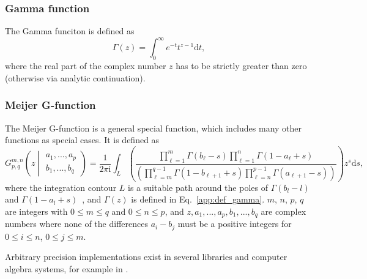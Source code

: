 \subsubsection*{Gamma function}
The Gamma funciton is defined as~\cite[Eq.~5.2.1]{NIST:DLMF}
\begin{equation}
\label{app:def_gamma}
\Gamma\left(z\right)=\int_{0}^{\infty}e^{-t}t^{z-1}\mathrm{d}t,
\end{equation}
where the real part of the complex number $z$ has to be strictly greater than zero (otherwise via analytic continuation).
\subsubsection*{Meijer G-function}
The Meijer G-function is a general special function, which includes many other functions as special cases. It is defined as
\begin{equation}
\label{app:def_meijerG}
G^{m,n}_{p,q}\left(z\middle|
\begin{matrix}
a_1,...,a_p\\
b_1,...,b_q
\end{matrix}
\right)
=
\frac{1}{2\pi\mathrm{i}}\int_{L%
}\left({\textstyle\frac{\prod\limits_{\ell=1}^{m}\Gamma\left(b_{\ell}-s\right%
)\prod\limits_{\ell=1}^{n}\Gamma\left(1-a_{\ell}+s\right)}{\left(\prod\limits_%
{\ell=m}^{q-1}\Gamma\left(1-b_{\ell+1}+s\right)\prod\limits_{\ell=n}^{p-1}%
\Gamma\left(a_{\ell+1}-s\right)\right)}}\right)z^{s}\mathrm{d}s,
\end{equation}
where the integration contour $L$ is a suitable path around the poles of $\Gamma(b_l-l)$ and \mbox{$\Gamma(1-a_l+s)$}~\cite[Eq.~16.17.1]{NIST:DLMF}, and $\Gamma(z)$ is defined in Eq.~\eqref{app:def_gamma}. $m$, $n$, $p$, $q$ are integers with $0 \leq m \leq q$ and $0 \leq n \leq p$, and $z,a_1,...,a_p,b_1,...,b_q$ are complex numbers where none of the differences $a_i-b_j$ must be a positive integers for $0\leq i \leq n$, $0\leq j \leq m$.

Arbitrary precision implementations exist in several libraries and computer algebra systems, for example in \cite{mpmath,Mathematica}.

